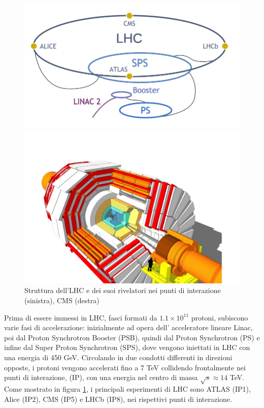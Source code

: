 \begin{figure}[t]
  \centering
  \begin{minipage}[b]{0.43\textwidth}
      \centering
      \includegraphics[width=\textwidth]{../ImmaginiTesi/LHC.png} 
  \end{minipage}
  \hfill 
  \begin{minipage}[b]{0.56\textwidth}
      \centering
      \includegraphics[width=\textwidth]{../ImmaginiTesi/CMS.png} 
  \end{minipage}
  \caption{Struttura dell'LHC e dei suoi rivelatori nei punti di interazione (sinistra), CMS (destra)}
  \label{fig:LHC-CMS}
\end{figure}


Prima di essere immessi in LHC, fasci formati da $1.1 \times 10^{11}$ protoni, subiscono varie fasi di accelerazione: inizialmente ad opera dell' acceleratore lineare Linac, poi dal Proton Synchrotron Booster (PSB), quindi dal Proton Synchrotron (PS) e infine dal Super Proton Synchrotron (SPS), dove vengono iniettati in LHC con una energia di 450 GeV. Circolando in due condotti differenti in direzioni opposte, i protoni vengono accelerati fino a 7 TeV collidendo frontalmente nei punti di interazione, (IP), con una energia nel centro di massa $\sqrt{s} \approx 14$ TeV. Come mostrato in figura \ref{fig:LHC-CMS}, i principali esperimenti di LHC sono ATLAS (IP1), Alice (IP2), CMS (IP5) e LHCb (IP8), nei rispettivi punti di interazione.


